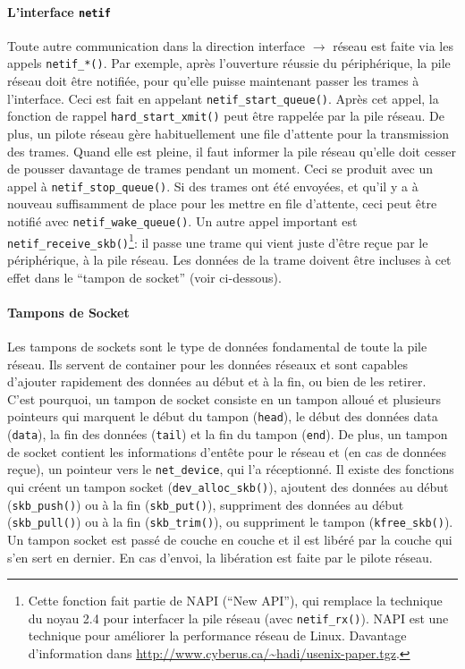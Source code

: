 \documentclass[a4paper,12pt,BCOR=6mm,bibtotoc,idxtotoc]{scrbook}
\begin{document}
\paragraph{L'interface \lstinline+netif+} Toute autre
communication dans la direction interface $\to$ r\'eseau est faite via
les appels \lstinline+netif_*()+. Par exemple, apr\`es l'ouverture
r\'eussie du p\'eriph\'erique, la pile r\'eseau doit \^etre
notifi\'ee, pour qu'elle puisse maintenant passer les trames \`a
l'interface.  Ceci est fait en appelant
\lstinline+netif_start_queue()+. Apr\`es cet appel, la fonction de
rappel \lstinline+hard_start_xmit()+ peut \^etre rappel\'ee par la
pile r\'eseau. De plus, un pilote r\'eseau g\`ere habituellement une
file d'attente pour la transmission des trames.  Quand elle est pleine,
il faut informer la pile r\'eseau qu'elle doit cesser de pousser
davantage de trames pendant un moment.  Ceci se produit avec un appel
\`a \lstinline+netif_stop_queue()+. Si des trames ont \'et\'e
envoy\'ees, et qu'il y a \`a nouveau suffisamment de place pour les
mettre en file d'attente, ceci peut \^etre notifi\'e avec
\lstinline+netif_wake_queue()+. Un autre appel important est
\lstinline+netif_receive_skb()+\footnote{Cette fonction fait partie de
NAPI (``New API''), qui remplace la technique du noyau 2.4 pour
interfacer la pile r\'eseau (avec \lstinline+netif_rx()+). NAPI est
une technique pour am\'eliorer la performance r\'eseau de
Linux. Davantage d'information dans
\url{http://www.cyberus.ca/~hadi/usenix-paper.tgz}.}: il passe une
trame qui vient juste d'\^etre re\c{c}ue par le p\'eriph\'erique, \`a
la pile r\'eseau.  Les donn\'ees de la trame doivent \^etre incluses
\`a cet effet dans le ``tampon de socket'' (voir ci-dessous).

\paragraph{Tampons de Socket} Les tampons de sockets
sont le type de donn\'ees fondamental de toute la pile r\'eseau.  Ils
servent de container pour les donn\'ees r\'eseaux et sont capables
d'ajouter rapidement des donn\'ees au d\'ebut et \`a la fin, ou bien
de les retirer. C'est pourquoi, un tampon de socket consiste en un
tampon allou\'e et plusieurs pointeurs qui marquent le d\'ebut du
tampon (\lstinline+head+), le d\'ebut des donn\'ees data
(\lstinline+data+), la fin des donn\'ees (\lstinline+tail+) et la fin
du tampon (\lstinline+end+). De plus, un tampon de socket contient les
informations d'ent\^ete pour le r\'eseau et (en cas de donn\'ees
re\c{c}ue), un pointeur vers le \lstinline+net_device+, qui l'a
r\'eceptionn\'e.  Il existe des fonctions qui cr\'eent un tampon
socket (\lstinline+dev_alloc_skb()+), ajoutent des donn\'ees au
d\'ebut (\lstinline+skb_push()+) ou \`a la fin
(\lstinline+skb_put()+), suppriment des donn\'ees au d\'ebut
(\lstinline+skb_pull()+) ou \`a la fin (\lstinline+skb_trim()+), ou
suppriment le tampon (\lstinline+kfree_skb()+).  Un tampon socket est
pass\'e de couche en couche et il est lib\'er\'e par la couche qui
s'en sert en dernier. En cas d'envoi, la lib\'eration est faite par le
pilote r\'eseau.
\end{document}
